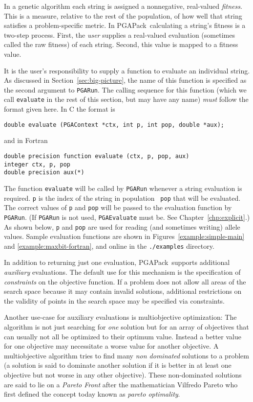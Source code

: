 \documentclass{report}
\newcommand{\pga}{PGAPack}
\begin{document}
In a genetic algorithm each string is assigned a nonnegative, real-valued {\em
fitness}.  This is a measure, relative to the rest of the population, of how
well that string satisfies a problem-specific metric.  In \pga\ calculating a
string's fitness is a two-step process.  First, the {\em user} supplies a
real-valued evaluation (sometimes called the raw fitness) of each string.
Second, this value is mapped to a fitness value.

It is the user's responsibility to supply a function to evaluate an individual
string.  As discussed in Section~\ref{sec:big-picture}, the name of this
function is specified as the second argument to {\tt PGARun}. The calling
sequence for this function (which we call {\tt evaluate} in the rest of this
section, but may have any name) {\em must} follow the format given here.  In C
the format is
\begin{verbatim}
double evaluate (PGAContext *ctx, int p, int pop, double *aux);
\end{verbatim}
and in Fortran
\begin{verbatim}
double precision function evaluate (ctx, p, pop, aux)
integer ctx, p, pop
double precision aux(*)
\end{verbatim}

The function {\tt evaluate} will be called by {\tt PGARun} whenever a string
evaluation is required.  {\tt p} is the index of the string in population {\tt
pop} that will be evaluated.  The correct values of {\tt p} and {\tt pop} will
be passed to the evaluation function by {\tt PGARun}.  (If {\tt PGARun} is not
used, {\tt PGAEvaluate} must be.  See Chapter~\ref{chp:explicit}.)
As shown below,  {\tt p}
and {\tt pop} are used for reading (and sometimes writing) allele values.
Sample evaluation functions
are shown in Figures~\ref{example:simple-main} and
\ref{example:maxbit-fortran}, and online in the {\tt ./examples} directory. 

In addition to returning just one evaluation, \pga\ supports
additional \textit{auxiliary} evaluations. The default use for this
mechanism is the specification of \textit{constraints} on the objective
function. If a problem does not allow all areas of the search space
because it may contain invalid solutions, additional restrictions on the
validity of points in the search space may be specified via constraints.

Another use-case for auxiliary evaluations is multiobjective
optimization: The algorithm is not just searching for \textit{one}
solution but for an array of objectives that can usually not all be
optimized to their optimum value. Instead a better value for one
objective may necessitate a worse value for another objective. A
multiobjective algorithm tries to find many \textit{non dominated}
solutions to a problem (a solution is said to dominate another solution
if it is better in at least one objective but not worse in any other
objective). These non-dominated solutions are said to lie on a
\textit{Pareto Front} after the mathematician Vilfredo Pareto who first
defined the concept today known as \textit{pareto optimality}.
\end{document}
